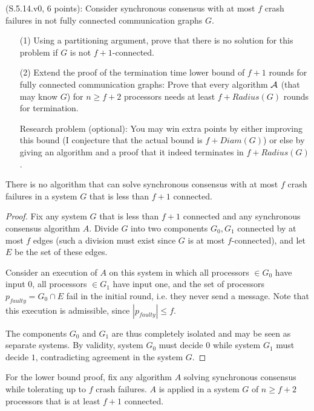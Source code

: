 \begin{Exc}{(S.5.14.v0, 6 points):}
Consider synchronous consensus with at most $f$ crash failures in not
fully connected communication graphs $G$.
\begin{enumerate}
\item[(1)] Using a partitioning argument, prove that there is no solution for this problem if $G$
is not $f+1$-connected.
\item[(2)] Extend the proof of the termination time lower bound of $f+1$ rounds
for fully connected communication graphs: Prove that every algorithm ${\cal A}$
(that may know $G$) for $n\geq f+2$ processors needs at least $f+Radius(G)$ rounds
for termination.

Research problem (optional): You may win extra points by either improving this
bound (I conjecture that the actual bound is $f+Diam(G)$) or else
by giving an algorithm and a proof that it indeed terminates in
$f+Radius(G)$.
\end{enumerate}
\end{Exc}

\begin{theorem}
There is no algorithm that can solve synchronous consensus with at most $f$
crash failures in a system $G$ that is less than $f+1$ connected.
\end{theorem}

\begin{proof}
Fix any system $G$ that is less than $f+1$ connected and any synchronous consensus
algorithm $A$. Divide $G$ into two components $G_0, G_1$ connected by at most $f$
edges (such a division must exist since $G$ is at most $f$-connected), and let
$E$ be the set of these edges.

Consider an execution of $A$ on this system in which all processors $\in G_0$
have input $0$, all processors $\in G_1$ have input one, and the set of processors
$p_{faulty} = G_0 \cap E$ fail in the initial round, i.e. they never send
a message. Note that this execution is admissible, since $|p_{faulty}| \leq f$.

The components $G_0$ and $G_1$ are thus completely isolated and may be seen as
separate systems. By validity, system $G_0$ must decide $0$ while system $G_1$
must decide $1$, contradicting agreement in the system $G$.
\end{proof}

For the lower bound proof, fix any algorithm $A$ solving synchronous consensus
while tolerating up to $f$ crash failures. $A$ is applied in a system $G$ of
$n \geq f+2$ processors that is at least $f+1$ connected.

